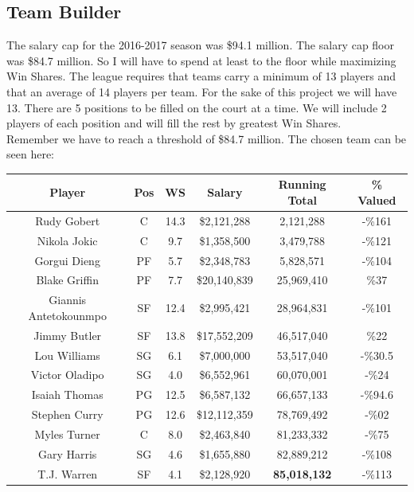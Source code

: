 \documentclass[12pt,english]{article}
\begin{document}
\subsection{Team Builder}
\onehalfspacing
The salary cap for the 2016-2017 season was \$94.1 million. The salary cap floor was \$84.7 million. So I will have to spend at least to the floor while maximizing Win Shares. The league requires that teams carry a minimum of 13 players and that an average of 14 players per team. For the sake of this project we will have 13. There are 5 positions to be filled on the court at a time. We will include 2 players of each position and will fill the rest by greatest Win Shares.\\
Remember we have to reach a threshold of \$84.7 million. The chosen team can be seen here:
\begin{center}
\begin{tabular}{||c|c|c|c|c|c||}
\hline
 Player & Pos & WS & Salary & Running Total &\% Valued \\ [.5ex]
\hline
Rudy Gobert & C & 14.3 & \$2,121,288 & 2,121,288 &-\%161 \\ 
\hline
Nikola Jokic & C & 9.7 & \$1,358,500 & 3,479,788 &-\%121 \\
\hline
Gorgui Dieng & PF & 5.7 & \$2,348,783 & 5,828,571 & -\%104 \\
\hline
Blake Griffin & PF & 7.7 & \$20,140,839 & 25,969,410 & \%37 \\
\hline
Giannis Antetokounmpo & SF & 12.4 & \$2,995,421 & 28,964,831 & -\%101 \\
\hline
Jimmy Butler & SF & 13.8 & \$17,552,209 & 46,517,040 & \%22 \\
\hline
Lou Williams & SG & 6.1 & \$7,000,000 & 53,517,040 & -\%30.5 \\
\hline
Victor Oladipo & SG & 4.0 & \$6,552,961 & 60,070,001 & -\%24 \\
\hline
Isaiah Thomas & PG & 12.5 & \$6,587,132 & 66,657,133 & -\%94.6 \\
\hline
Stephen Curry & PG & 12.6 & \$12,112,359 & 78,769,492 & -\%02 \\
\hline
Myles Turner & C & 8.0 & \$2,463,840 & 81,233,332 & -\%75 \\
\hline
Gary Harris & SG & 4.6 & \$1,655,880 & 82,889,212 & -\%108 \\
\hline
T.J. Warren & SF & 4.1 & \$2,128,920 & \textbf{85,018,132} & -\%113 \\
\hline
\end{tabular}
\end{center}
\end{document}
